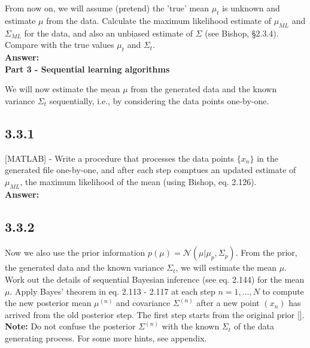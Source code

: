 \documentclass[a4paper]{article}
\begin{document}
From now on, we will assume (pretend) the 'true' mean $\mu_t$ is unknown and estimate $\mu$ from the data. Calculate the maximum likelihood estimate of $\mu_{ML}$ and $\Sigma_{ML}$ for the data, and also an unbiased estimate of $\Sigma$ (see Bishop, §2.3.4). Compare with the true values $\mu_t$ and $\Sigma_t$.\\

\textbf{Answer:}\\



\textbf{Part 3 - Sequential learning algorithms}

We will now estimate the mean $\mu$ from the generated data and the known variance $\Sigma_t$ sequentially, i.e., by considering the data points one-by-one.

\subsection*{3.3.1}

[MATLAB] - Write a procedure that processes the data points $\{ x_n \}$ in the generated file one-by-one, and after each step comptues an updated estimate of $\mu_{ML}$, the maximum likelihood of the mean (using Bishop, eq. 2.126).\\


\textbf{Answer:}\\





\subsection*{3.3.2}


Now we also use the prior information $p(\mu) = \mathcal{N}(\mu | \mu_p, \Sigma_p)$. From the prior, the generated data and the known variance $\Sigma_t$, we will estimate the mean $\mu$.\\

Work out the details of sequential Bayesian inference (see eq. 2.144) for the mean $\mu$. Apply Bayes' theorem in eq. 2.113 - 2.117 at each step $n = 1, ..., N$ to compute the new posterior mean $\mu^{(n)}$ and covariance $\Sigma^{(n)}$ after a new point $(x_n)$ has arrived from the old posterior step. The first step starts from the original prior \ref{}.\\
\textbf{Note:} Do not confuse the posterior $\Sigma^{(n)}$ with the known $\Sigma_t$ of the data generating process. For some more hints, see appendix.\\
\end{document}
